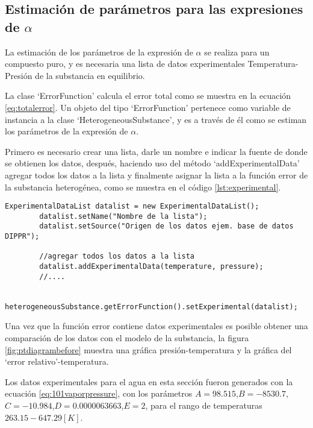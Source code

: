 \subsection{Estimación de parámetros para las expresiones de $\alpha$}\label{subsec:alphaoptim}

	La estimación de los parámetros de la expresión de $\alpha$ se realiza para un compuesto puro, y es necesaria una lista de datos experimentales Temperatura-Presión  de la substancia en equilibrio. 

	La clase `ErrorFunction' calcula el error total como se muestra en la ecuación \ref{eq:totalerror}. Un objeto del tipo `ErrorFunction' pertenece como variable de instancia a la clase `HeterogeneousSubstance', y es a través de él como se estiman los parámetros de la expresión de $\alpha$.

	Primero es necesario crear una lista, darle un nombre e indicar la fuente de donde se obtienen los datos, después, haciendo uso del método `addExperimentalData' agregar todos los datos a la lista y finalmente asignar la lista a la función error de la substancia heterogénea, como se muestra en el código \ref{lst:experimental}.

	\begin{lstlisting}[label={lst:experimental},caption={Creación de una lista de datos experimentales presión-temperatura con la clase `ExperimentalDataList'}]
		ExperimentalDataList datalist = new ExperimentalDataList();
		datalist.setName("Nombre de la lista");
		datalist.setSource("Origen de los datos ejem. base de datos DIPPR");

		//agregar todos los datos a la lista
		datalist.addExperimentalData(temperature, pressure);
		//....

		heterogeneousSubstance.getErrorFunction().setExperimental(datalist);
	\end{lstlisting}

	Una vez que la función error contiene datos experimentales es posible obtener una comparación de los datos con el modelo de la substancia, la figura \ref{fig:ptdiagrambefore} muestra una gráfica presión-temperatura y la gráfica del `error relativo'-temperatura.


	Los datos experimentales para el agua en esta sección fueron generados con la ecuación \ref{eq:101vaporpressure}, con los parámetros $A = 98.515$,$B=-8530.7$,$C=-10.984$,$D=0.0000063663$,$E=2$, para el rango de temperaturas $263.15-647.29 [K]$.

